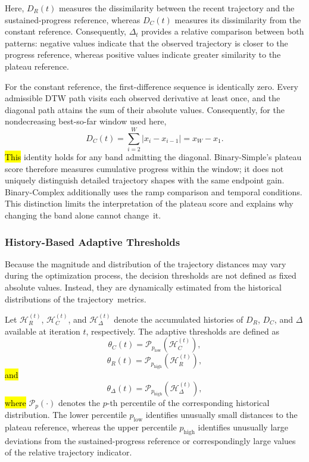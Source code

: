 \documentclass[mathematics,article,accept,moreauthors]{Definitions/mdpi}
\begin{document}
Here, $D_R(t)$ measures the dissimilarity between the recent trajectory and
the sustained-progress reference, whereas $D_C(t)$ measures its
dissimilarity from the constant reference. Consequently, $\Delta_t$
provides a relative comparison between both patterns: negative values
indicate that the observed trajectory is closer to the progress reference,
whereas positive values indicate greater similarity to the plateau
reference.

For the constant reference, the first-difference sequence is identically
zero. Every admissible DTW path visits each observed derivative at least
once, and the diagonal path attains the sum of their absolute values.
Consequently, for the nondecreasing best-so-far window used here,
\begin{equation}
D_C(t)=\sum_{i=2}^{W}|x_i-x_{i-1}|=x_W-x_1.
\label{eq:plateau_score_identity}
\end{equation}
\hl{This} identity holds for any band admitting the diagonal. Binary-Simple's
plateau score therefore measures cumulative progress within the window;
it does not uniquely distinguish detailed trajectory shapes with the same
endpoint gain. Binary-Complex additionally uses the ramp comparison and
temporal conditions. This distinction limits the interpretation of the
plateau score and explains why changing the band alone cannot change~it.


\subsubsection{History-Based Adaptive Thresholds}

Because the magnitude and distribution of the trajectory distances may vary
during the optimization process, the decision thresholds are not defined as
fixed absolute values. Instead, they are dynamically estimated from the
historical distributions of the trajectory~metrics.

Let $\mathcal{H}_{R}^{(t)}$, $\mathcal{H}_{C}^{(t)}$, and
$\mathcal{H}_{\Delta}^{(t)}$ denote the accumulated histories of $D_R$,
$D_C$, and $\Delta$ available at iteration $t$, respectively. The adaptive
thresholds are defined as
\begin{equation}
\theta_C(t)
=
\mathcal{P}_{p_{\mathrm{low}}}
\left(\mathcal{H}_{C}^{(t)}\right),
\label{eq:threshold_c}
\end{equation}
\begin{equation}
\theta_R(t)
=
\mathcal{P}_{p_{\mathrm{high}}}
\left(\mathcal{H}_{R}^{(t)}\right),
\label{eq:threshold_r}
\end{equation}
\hl{and}
\begin{equation}
\theta_{\Delta}(t)
=
\mathcal{P}_{p_{\mathrm{high}}}
\left(\mathcal{H}_{\Delta}^{(t)}\right),
\label{eq:threshold_delta}
\end{equation}
\hl{where} $\mathcal{P}_{p}(\cdot)$ denotes the $p$-th percentile of the
corresponding historical distribution. The lower percentile
$p_{\mathrm{low}}$ identifies unusually small distances to the plateau
reference, whereas the upper percentile $p_{\mathrm{high}}$ identifies
unusually large deviations from the sustained-progress reference or
correspondingly large values of the relative trajectory indicator.
\end{document}
